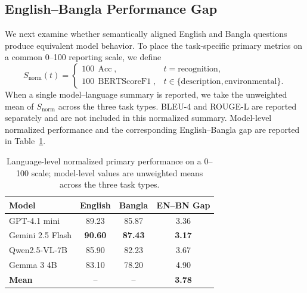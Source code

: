 \documentclass{article}
\begin{document}
\subsection{English--Bangla Performance Gap}
\label{subsec:language_gap}
We next examine whether semantically aligned English and Bangla questions produce equivalent model behavior. To place the task-specific primary metrics on a common 0--100 reporting scale, we define
\begin{equation}
S_{\mathrm{norm}}(t)=
\begin{cases}
100\,\operatorname{Acc}, & t=\text{recognition},\\
100\,\operatorname{BERTScoreF1}, & t\in\{\text{description},\text{environmental}\}.
\end{cases}
\label{eq:normalized_primary_score}
\end{equation}
When a single model--language summary is reported, we take the unweighted mean of $S_{\mathrm{norm}}$ across the three task types. BLEU-4 and ROUGE-L are reported separately and are not included in this normalized summary. Model-level normalized performance and the corresponding English--Bangla gap are reported in Table~\ref{tab:language_model_gap}.
\begin{table}[t]
\centering
\caption{Language-level normalized primary performance on a 0--100 scale; model-level values are unweighted means across the three task types.}
\label{tab:language_model_gap}
\begin{tabular}{lccc}
\toprule
\textbf{Model}
& \textbf{English}
& \textbf{Bangla}
& \textbf{EN--BN Gap} \\
\midrule
GPT-4.1 mini
& 89.23
& 85.87
& 3.36 \\

Gemini 2.5 Flash
& \textbf{90.60}
& \textbf{87.43}
& \textbf{3.17} \\

Qwen2.5-VL-7B
& 85.90
& 82.23
& 3.67 \\

Gemma 3 4B
& 83.10
& 78.20
& 4.90 \\

\midrule
\textbf{Mean}
& --
& --
& \textbf{3.78} \\
\bottomrule
\end{tabular}
\end{table}
\end{document}
